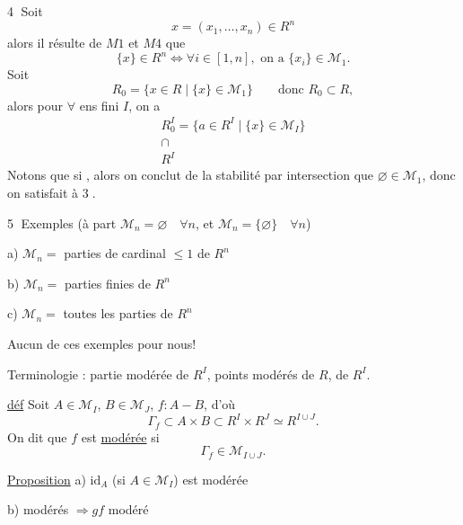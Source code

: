 \textcircled{4} Soit 
\[
x=(x_1,\ldots,x_n)\in R^n
\]
alors il résulte de $M1$ et $M4$ que
\[
\{x\}\in R^n\Longleftrightarrow\forall i\in[1,n],\text{ on a }\{x_i\}\in\mathcal M_1.
\]
Soit
\[
R_0=\{x\in R\mid\{x\}\in\mathcal M_1\}\qquad\text{donc }R_0\subset R,
\]
alors pour $\forall$ ens fini $I$, on a
\[
\begin{array}{l}
R_0^I=\{a\in R^I\mid\{x\}\in\mathcal M_I\}\\
\cap\\
R^I
\end{array}
\]
Notons que si  , alors on conclut de la stabilité  par intersection que $\varnothing\in\mathcal M_1$, donc on satisfait à \textcircled{3}.

\textcircled{5} Exemples (à part $\mathcal M_n=\varnothing\quad\forall n$, et $\mathcal M_n=\{\varnothing\}\quad\forall n$)

a) $\mathcal M_n=$ parties de cardinal $\le1$ de $R^n$

b) $\mathcal M_n=$ parties finies de $R^n$

c) $\mathcal M_n=$ toutes les parties de $R^n$

Aucun de ces exemples   pour nous!


Terminologie : partie modérée de $R^I$, points modérés de $R$, de $R^I$.

\uline{déf} Soit $A\in\mathcal M_I$, $B\in\mathcal M_J$, $f:A\mathbin{-}B$, d'où
\[
\Gamma_f\subset A\times B\subset R^I\times R^J\simeq R^{I\cup J}.
\]
On dit que $f$ est \uline{modérée} si
\[
\Gamma_f\in\mathcal M_{I\cup J}.
\]

\uline{Proposition} a) $\mathrm{id}_A$ (si $A\in\mathcal M_I$) est modérée

b)  modérés $\Longrightarrow gf$ modéré

